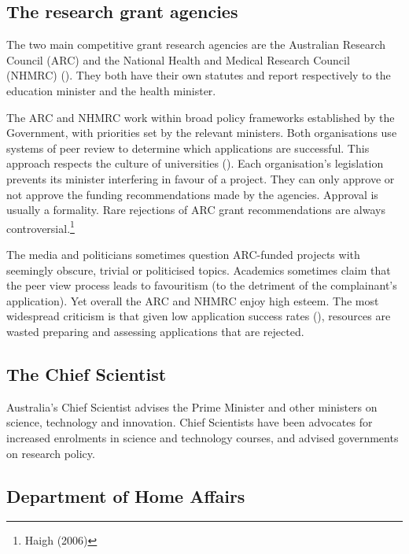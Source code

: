 \documentclass{grattan}
\begin{document}
%
\subsection{The research grant agencies}\label{subsec:the-research-grant-agencies}

The two main competitive grant research agencies are the Australian Research Council (ARC) and the National Health and Medical Research Council (NHMRC) (). They both have their own statutes and report respectively to the education minister and the health minister.

The ARC and NHMRC work within broad policy frameworks established by the Government, with priorities set by the relevant ministers. Both organisations use systems of peer review to determine which applications are successful. This approach respects the culture of universities (). Each organisation's legislation prevents its minister interfering in favour of a project. They can only approve or not approve the funding recommendations made by the agencies. Approval is usually a formality. Rare rejections of ARC grant recommendations are always controversial.\footnote{Haigh (2006)}

The media and politicians sometimes question ARC-funded projects with seemingly obscure, trivial or politicised topics. Academics sometimes claim that the peer view process leads to favouritism (to the detriment of the complainant's application). Yet overall the ARC and NHMRC enjoy high esteem. The most widespread criticism is that given low application success rates (), resources are wasted preparing and assessing applications that are rejected.

%
\subsection{The Chief Scientist}\label{subsec:the-chief-scientist}

Australia's Chief Scientist advises the Prime Minister and other ministers on science, technology and innovation. Chief Scientists have been advocates for increased enrolments in science and technology courses, and advised governments on research policy.

%
\subsection{Department of Home Affairs}\label{subsec:department-of-home-affairs}
\end{document}
